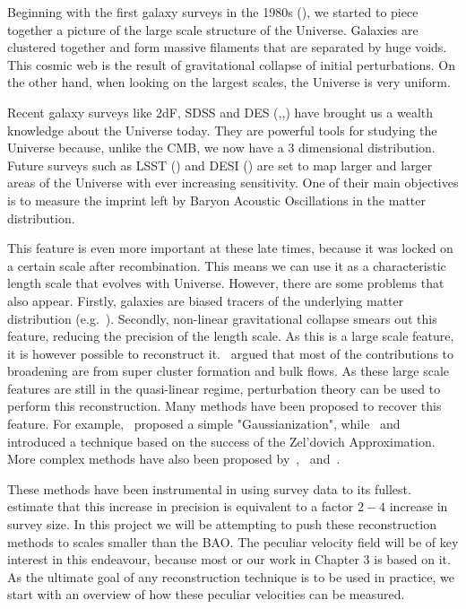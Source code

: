 Beginning with the first galaxy surveys in the 1980s (\cite{Davis_galaxy_survey}), we started to piece together a picture of the large scale structure of the Universe. Galaxies are clustered together and form massive filaments that are separated by huge voids. This cosmic web is the result of gravitational collapse of initial perturbations. On the other hand, when looking on the largest scales, the Universe is very uniform.

Recent galaxy surveys like 2dF, SDSS and DES (\cite{2005MNRAS.362..505C},\cite{PhysRevD.69.103501},\cite{2017arXiv170801530D}) have brought us a wealth knowledge about the Universe today. They are powerful tools for studying the Universe because, unlike the CMB, we now have a 3 dimensional distribution. Future surveys such as LSST (\cite{2009arXiv0912.0201L}) and DESI (\cite{2013arXiv1308.0847L}) are set to map larger and larger areas of the Universe with ever increasing sensitivity. One of their main objectives is to measure the imprint left by Baryon Acoustic Oscillations in the matter distribution. 

This feature is even more important at these late times, because it was locked on a certain scale after recombination. This means we can use it as a characteristic length scale that evolves with Universe. However, there are some problems that also appear. Firstly, galaxies are biased tracers of the underlying matter distribution (e.g.~\cite{2016arXiv161109787D}). Secondly, non-linear gravitational collapse smears out this feature, reducing the precision of the length scale. As this is a large scale feature, it is however possible to reconstruct it.~\cite{Eisenstein_BAOpeak_reconstruction} argued that most of the contributions to broadening are from super cluster formation and bulk flows. As these large scale features are still in the quasi-linear regime, perturbation theory can be used to perform this reconstruction. Many methods have been proposed to recover this feature. For example,~\cite{1992MNRAS.254..315W} proposed a simple "Gaussianization", while~\cite{1992ApJ...391..443N} and~\cite{1993ApJ...405..449G} introduced a technique based on the success of the Zel'dovich Approximation. More complex methods have also been proposed by~\cite{1999MNRAS.308..763M},~\cite{1997MNRAS.285..793C} and~\cite{2003MNRAS.346..501B}.

These methods have been instrumental in using survey data to its fullest.~\cite{2013PhR...530...87W} estimate that this increase in precision is equivalent to a factor $2-4$ increase in survey size. In this project we will be attempting to push these reconstruction methods to scales smaller than the BAO. The peculiar velocity field will be of key interest in this endeavour, because most or our work in Chapter 3 is based on it. As the ultimate goal of any reconstruction technique is to be used in practice, we start with an overview of how these peculiar velocities can be measured. 


